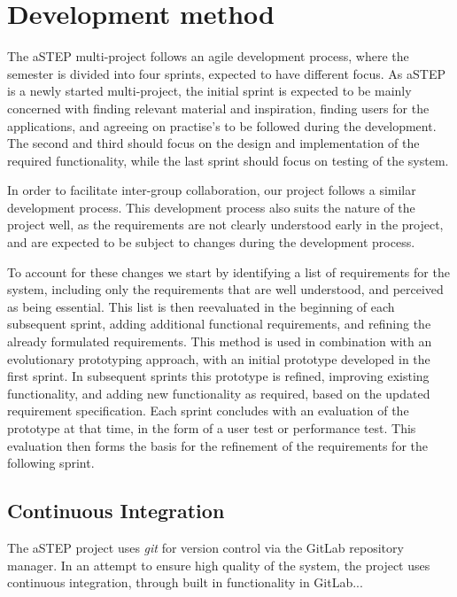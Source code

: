 \section{Development method} \label{sec:dev_method}
The aSTEP multi-project follows an agile development process, where the semester is divided into four sprints, expected to have different focus. As aSTEP is a newly started multi-project, the initial sprint is expected to be mainly concerned with finding relevant material and inspiration, finding users for the applications, and agreeing on practise's to be followed during the development. The second and third should focus on the design and implementation of the required functionality, while the last sprint should focus on testing of the system.

In order to facilitate inter-group collaboration, our project follows a similar development process. This development process also suits the nature of the project well, as the requirements are not clearly understood early in the project, and are expected to be subject to changes during the development process. 

To account for these changes we start by identifying a list of requirements for the system, including only the requirements that are well understood, and perceived as being essential. This list is then reevaluated in the beginning of each subsequent sprint, adding additional functional requirements, and refining the already formulated requirements. This method is used in combination with an evolutionary prototyping approach, with an initial prototype developed in the first sprint. In subsequent sprints this prototype is refined, improving existing functionality, and adding new functionality as required, based on the updated requirement specification. Each sprint concludes with an evaluation of the prototype at that time, in the form of a user test or performance test. This evaluation then forms the basis for the refinement of the requirements for the following sprint. 


\subsection{Continuous Integration}
The aSTEP project uses \emph{git} for version control via the GitLab repository manager. In an attempt to ensure high quality of the system, the project uses continuous integration, through built in functionality in GitLab... 
